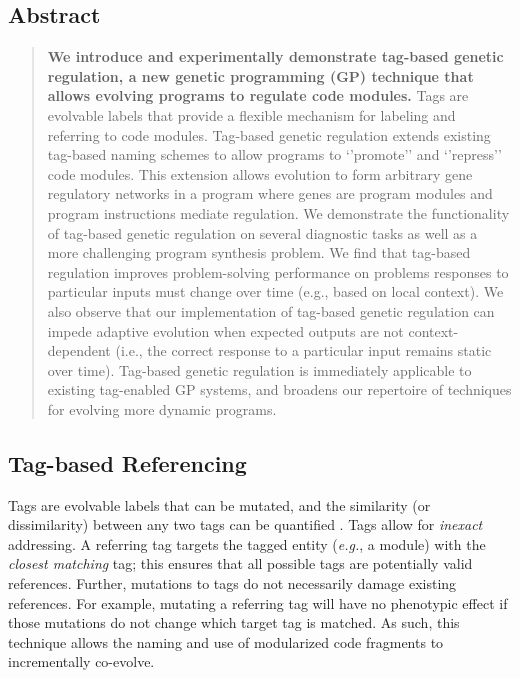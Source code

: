 \documentclass[
]{book}
\begin{document}
\hypertarget{abstract}{%
\subsection{Abstract}\label{abstract}}

\begin{quote}
\textbf{We introduce and experimentally demonstrate tag-based genetic regulation, a new genetic programming (GP) technique that allows evolving programs to regulate code modules.}
Tags are evolvable labels that provide a flexible mechanism for labeling and referring to code modules.
Tag-based genetic regulation extends existing tag-based naming schemes to allow programs to `'promote'' and `'repress'' code modules.
This extension allows evolution to form arbitrary gene regulatory networks in a program where genes are program modules and program instructions mediate regulation.
We demonstrate the functionality of tag-based genetic regulation on several diagnostic tasks as well as a more challenging program synthesis problem.
We find that tag-based regulation improves problem-solving performance on problems responses to particular inputs must change over time (e.g., based on local context).
We also observe that our implementation of tag-based genetic regulation can impede adaptive evolution when expected outputs are not context-dependent (i.e., the correct response to a particular input remains static over time).
Tag-based genetic regulation is immediately applicable to existing tag-enabled GP systems, and broadens our repertoire of techniques for evolving more dynamic programs.
\end{quote}

\hypertarget{tag-based-referencing}{%
\subsection{Tag-based Referencing}\label{tag-based-referencing}}

Tags are evolvable labels that can be mutated, and the similarity (or dissimilarity) between any two tags can be quantified \citep{spector_tag-based_2011}.
Tags allow for \emph{inexact} addressing.
A referring tag targets the tagged entity (\emph{e.g.}, a module) with the \emph{closest matching} tag;
this ensures that all possible tags are potentially valid references.
Further, mutations to tags do not necessarily damage existing references.
For example, mutating a referring tag will have no phenotypic effect if those mutations do not change which target tag is matched.
As such, this technique allows the naming and use of modularized code fragments to incrementally co-evolve.
\end{document}

